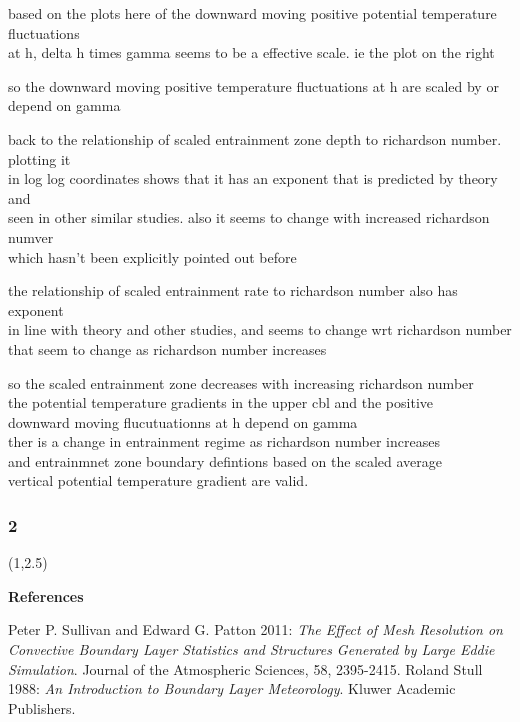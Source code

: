 \documentclass{beamer}
\newcommand\FrameText[1]{
\begin{textblock}{16}(1,2.5)
\raggedright #1
\end{textblock}}
\begin{document}
\begin{frame}
based on the plots here of the downward moving positive potential temperature fluctuations\\
at h, delta h times gamma seems to be a effective scale. ie the plot on the right
\end{frame}


\begin{frame}
so the downward moving positive temperature fluctuations at h are scaled by or depend on gamma
\end{frame}

\begin{frame}
back to the relationship of scaled entrainment zone depth to richardson number.  plotting it\\
in log log coordinates shows that it has an exponent that is predicted by theory and\\
seen in other similar studies.  also it seems to change with increased richardson numver\\
which hasn't been explicitly pointed out before\\
\end{frame}

\begin{frame}
the relationship of scaled entrainment rate to richardson number also has exponent\\
in line with theory and other studies, and seems to change wrt richardson number\\
that seem to change as richardson number increases
\end{frame}

\begin{frame}
so the scaled entrainment zone decreases with increasing richardson number\\
the potential temperature gradients in the upper cbl and the positive\\
downward moving flucutuationns at h depend on gamma\\
ther is a change in entrainment regime as richardson number increases\\
and entrainmnet zone boundary defintions based on the scaled average\\
vertical potential temperature gradient are valid.
\end{frame}

\begin{frame}
\frametitle{2}
\FrameText{\bf{\large References}}
\begin{thebibliography}{99}
 Peter P. Sullivan and Edward G. Patton 2011: \emph{The Effect of Mesh Resolution on Convective Boundary Layer Statistics and Structures Generated by Large Eddie Simulation}. Journal of the Atmospheric Sciences, 58, 2395-2415.
 Roland Stull 1988: \emph{An Introduction to Boundary Layer Meteorology}. Kluwer Academic Publishers.

\end{thebibliography}
\end{frame}
\end{document}

